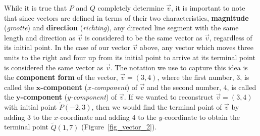While it is true that $P$ and $Q$ completely determine $\vec{v}$, it is important to note that since vectors are defined in terms of their two characteristics,  \textbf{magnitude} (\textit{grootte}) and \textbf{direction} (\textit{richting}), any directed line segment with the same length and direction as $\vec{v}$ is considered to be the same vector as $\vec{v}$, regardless of its initial point. In the case of our vector $\vec{v}$ above, any vector which moves three units to the right and four up from its initial point to arrive at its terminal point is considered the same vector as $\vec{v}$.  The notation we use to capture this idea is the \textbf{component form} of the vector, $\vec{v} = \left(3,4\right)$, where the first number, $3$, is called the \textbf{$\boldsymbol{x}$-component} (\textit{$x$-component}) of $\vec{v}$ and the second number, $4$, is called the \textbf{$\boldsymbol{y}$-component} (\textit{$y$-component}) of $\vec{v}$.  If we wanted to reconstruct $\vec{v} = \left(3,4\right)$ with initial point $\widetilde{P}(-2,3)$, then we would find the terminal point of $\vec{v}$ by adding $3$ to the $x$-coordinate and adding $4$ to the $y$-coordinate to obtain the terminal point $\widetilde{Q}(1,7)$ (Figure~\ref{fig_vector_2}).


